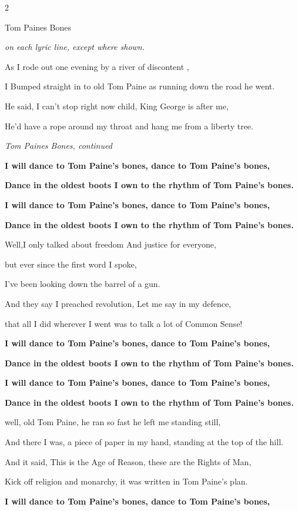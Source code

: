 \documentclass[10pt,twoside]{article}
\newcommand{\songtext}{\raggedright\fontsize{9bp}{9.15bp}\selectfont}
\newenvironment{songcolumns}
  {\begin{multicols*}{2}\songtext}
  {\end{multicols*}}
\newcommand{\songtitle}[1]{%
  \par\addvspace{9bp}%
  {\titleface\fontsize{14.5bp}{15bp}\selectfont #1\par}%
  \nobreak\vskip 2bp%
}
\newcommand{\lyric}[1]{%
  \hangindent=9bp\relax
  #1\par
}
\newenvironment{stanza}{\par\begingroup}{\par\endgroup\addvspace{4bp}}
\newcommand{\refrain}[1]{\lyric{\textbf{#1}}}
\newcommand{\linechords}[1]{%
  \par\nobreak\vskip 2bp
  {\chordface\fontsize{9bp}{10bp}\selectfont\formatchords{#1}\par}%
  \addvspace{4bp}%
}
\newcommand{\playnote}[1]{%
  \par\addvspace{4bp}%
  {\sffamily\itshape\fontsize{7bp}{8bp}\selectfont #1\par}%
  \nobreak
}
\begin{document}
\begin{songcolumns}
\songtitle{Tom Paines Bones}
\playnote{ on each lyric line, except where shown.}
\begin{stanza}
  \lyric{As I rode out one evening by a river of discontent ,}
  \lyric{I Bumped straight in to old Tom Paine as running down the road he went.}
  \lyric{He said, \textquotedbl{}I can't stop right now child, King George is after me,}
  \lyric{He'd have a rope around my throat and hang me from a liberty tree.\textquotedbl{}}
\end{stanza}

\columnbreak

\playnote{Tom Paines Bones, continued}
\begin{stanza}
  \refrain{I will dance to Tom Paine's bones, dance to Tom Paine's bones,}
  \refrain{Dance in the oldest boots I own to the rhythm of Tom Paine's bones.}
  \refrain{I will dance to Tom Paine's bones, dance to Tom Paine's bones,}
  \refrain{Dance in the oldest boots I own to the rhythm of Tom Paine's bones.}
\end{stanza}
\begin{stanza}
  \lyric{Well,I only talked about freedom And justice for everyone,}
  \lyric{but ever since the first word I spoke,}
  \lyric{I've been looking down the barrel of a gun.}
  \lyric{And they say I preached revolution, Let me say in my defence,}
  \lyric{that all I did wherever I went was to talk a lot of Common Sense!}
  \linechords{\mbox{C G Am F /} \mbox{C G /} \mbox{Am F /} \mbox{C G Am F /} \mbox{C G Am F}}
\end{stanza}
\begin{stanza}
  \refrain{I will dance to Tom Paine's bones, dance to Tom Paine's bones,}
  \refrain{Dance in the oldest boots I own to the rhythm of Tom Paine's bones.}
  \refrain{I will dance to Tom Paine's bones, dance to Tom Paine's bones,}
  \refrain{Dance in the oldest boots I own to the rhythm of Tom Paine's bones.}
\end{stanza}
\begin{stanza}
  \lyric{well, old Tom Paine, he ran so fast he left me standing still,}
  \lyric{And there I was, a piece of paper in my hand, standing at the top of the hill.}
  \lyric{And it said, \textquotedbl{}This is the Age of Reason, these are the Rights of Man,}
  \lyric{Kick off religion and monarchy\textquotedbl{}, it was written in Tom Paine's plan.}
\end{stanza}
\begin{stanza}
  \refrain{I will dance to Tom Paine's bones, dance to Tom Paine's bones,}

\end{stanza}
\end{songcolumns}
\end{document}
